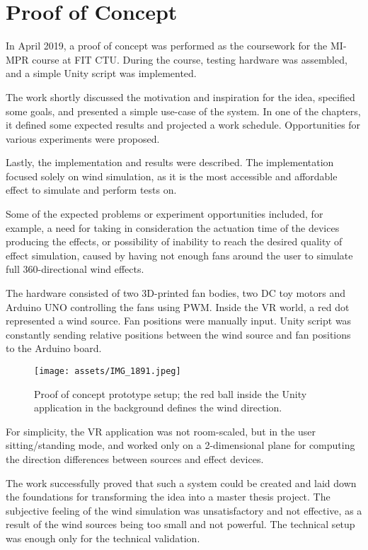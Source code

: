 \chapter{Proof of Concept}\label{poc}

In April 2019, a proof of concept was performed as the coursework for the MI-MPR
course at FIT CTU. During the course, testing hardware was assembled,
and a simple Unity script was implemented.


The work shortly discussed the motivation and inspiration for the idea,
specified some goals, and presented a simple use-case of the system. In one of the
chapters, it defined some expected results and projected a work schedule.
Opportunities for various experiments were proposed.


Lastly, the implementation and results were described. The implementation
focused solely on wind simulation, as it is the most accessible and affordable
effect to simulate and perform tests on.


Some of the expected problems or experiment opportunities included, for example,
a need for taking in consideration the actuation time of the devices producing
the effects, or possibility of inability to reach the desired quality of effect
simulation, caused by having not enough fans around the user to simulate
full 360-directional wind effects.


The hardware consisted of two 3D-printed fan bodies, two DC toy motors and Arduino
UNO controlling the fans using PWM. Inside
the VR world, a red dot represented a wind source. Fan positions were manually
input. Unity script was constantly sending relative positions between the
wind source and fan positions to the Arduino board.


\begin{figure}[h]{}
\centering\texttt{[image: assets/IMG\_1891.jpeg]}
\caption{
    Proof of concept prototype setup; the red ball inside the Unity application in the background defines the wind direction.
}
\end{figure}

For simplicity, the VR application was not room-scaled, but in the
user sitting/standing mode, and worked only on a 2-dimensional plane for
computing the direction differences between sources and effect devices.


The work successfully proved that such a system could be created and laid down
the foundations for transforming the idea into a master thesis project. The subjective
feeling of the wind simulation was unsatisfactory and not effective, 
as a result of the wind sources being too small and not powerful. 
The technical setup was enough only for the technical validation.

